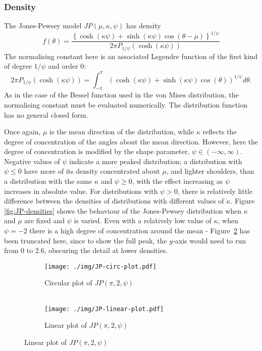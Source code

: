 \documentclass[../../ArchStats.tex]{subfiles}
\begin{document}
\subsubsection{Density}
The Jones-Pewsey model $JP(\mu, \kappa, \psi)$ has density
	\begin{equation}
	f(\theta) = \frac{\left\lbrace \cosh(\kappa\psi) + \sinh(\kappa\psi) \cos(\theta - \mu) \right\rbrace ^ {1/\psi}}{2\pi P_{1/\psi}(\cosh(\kappa\psi))}
	\end{equation}
The normalising constant here is an associated Legendre function of the first kind of degree $1/\psi$ and order 0:
	\begin{equation}
	2\pi P_{1/\psi}(\cosh(\kappa\psi)) = \int_{-\pi}^\pi \left( \cosh(\kappa \psi) + \sinh(\kappa\psi)\cos(\theta)\right)^{1/\psi}d\theta.
	\end{equation}
As in the case of the Bessel function used in the von Mises distribution, the normalising constant must be evaluated numerically. The distribution function has no general closed form.

Once again, $\mu$ is the mean direction of the distribution, while $\kappa$ reflects the degree of concentration of the angles about the mean direction. However, here the degree of concentration is modified by the shape parameter, $\psi \in (-\infty, \infty)$. Negative values of $\psi$ indicate a more peaked distribution; a distribution with $\psi \leq 0$ have more of its density concentrated about $\mu$, and lighter shoulders, than a distribution with the same $\kappa$ and $\psi \geq 0$, with the effect increasing as $\psi$ increases in absolute value. For distributions with $\psi > 0$, there is relatively little difference between the densities of distributions with different values of $\kappa$. Figure \ref{fig:JP-densities} shows the behaviour of the Jones-Pewsey distribution when $\kappa$ and $\mu$ are fixed and $\psi$ is varied. Even with a relatively low value of $\kappa$, when $\psi = -2$ there is a high degree of concentration around the mean - Figure~\ref{fig:JP-linear} has been truncated here, since to show the full peak, the $y$-axis would need to run from 0 to 2.6, obscuring the detail at lower densities.

\begin{figure}[!ht]
\centering
\caption{Jones-Pewsey densities with $\mu = \pi$, $\kappa = 2$, and varying $\psi$}
\label{fig:JP-densities}
%
\begin{subfigure}[t]{0.47\textwidth}
\centering
\caption{Circular plot of $JP(\pi, 2, \psi)$ \\ \textcolor{white}{spacer}}
\texttt{[image: ./img/JP-circ-plot.pdf]}
\end{subfigure}
%
\begin{subfigure}[t]{0.47\textwidth}
\centering
\caption{Linear plot of $JP(\pi, 2, \psi)$}
\label{fig:JP-linear}
\texttt{[image: ./img/JP-linear-plot.pdf]}
\end{subfigure}
%
\end{figure}
\end{document}
